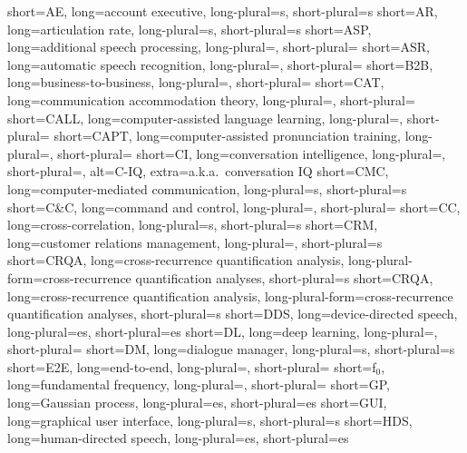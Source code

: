 		{short=AE,		long=account executive,								long-plural=s, short-plural=s}
		{short=AR,		long=articulation rate,								long-plural=s, short-plural=s}
	{short=ASP,		long=additional speech processing,  				long-plural=, short-plural=}
	{short=ASR, 	long=automatic speech recognition, 					long-plural=, short-plural=}
	{short=B2B, 	long=business-to-business,							long-plural=, short-plural=}
	{short=CAT, 	long=communication accommodation theory, 			long-plural=, short-plural=}
	{short=CALL, 	long=computer-assisted language learning, 			long-plural=, short-plural=}
	{short=CAPT, 	long=computer-assisted pronunciation training, 		long-plural=, short-plural=}
		{short=CI, 		long=conversation intelligence, 					long-plural=, short-plural=, alt=C-IQ, extra=a.k.a.\ conversation IQ}
	{short=CMC, 	long=computer-mediated communication, 				long-plural=s, short-plural=s}
	{short=C\&C, 	long=command and control, 							long-plural=, short-plural=}
		{short=CC, 		long=cross-correlation,								long-plural=s, short-plural=s}
	{short=CRM, 	long=customer relations management,					long-plural=, short-plural=s}
	{short=CRQA, 	long=cross-recurrence quantification analysis,		long-plural-form=cross-recurrence quantification analyses, short-plural=s}
	{short=CRQA, 	long=cross-recurrence quantification analysis,		long-plural-form=cross-recurrence quantification analyses, short-plural=s}
	{short=DDS, 	long=device-directed speech, 						long-plural=es, short-plural=es}
		{short=DL,		long=deep learning,									long-plural=, short-plural=}
		{short=DM,		long=dialogue manager,								long-plural=s, short-plural=s}
	{short=E2E,		long=end-to-end,									long-plural=, short-plural=}
		{short=f$_0$,	long=fundamental frequency, 						long-plural=, short-plural=}
		{short=GP,		long=Gaussian process,								long-plural=es, short-plural=es}
	{short=GUI, 	long=graphical user interface, 						long-plural=s, short-plural=s}
	{short=HDS, 	long=human-directed speech, 						long-plural=es, short-plural=es}
